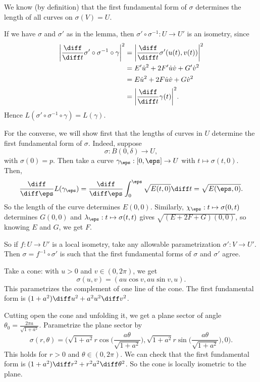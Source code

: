 \documentclass[12pt]{article}
\begin{document}
\begin{proofbox}
	We know (by definition) that the first fundamental form of $\sigma$ determines the length of all curves on $\sigma(V) = U$.

	If we have $\sigma$ and $\sigma'$ as in the lemma, then $\sigma' \circ \sigma^{-1} : U \to U'$ is an isometry, since
	\begin{align*}
		\biggl| \frac{\diff}{\diff t}\sigma' \circ \sigma^{-1} \circ \gamma \biggr|^2 &= \biggl|\frac{\diff}{\diff t} \sigma'(u(t), v(t)) \biggr|^2 \\
											      &= E' \dot u^2 + 2F' \dot u \dot v + G' \dot v^2 \\
											      &= E\dot u^2 + 2 F \dot u \dot v + G \dot v^2 \\
											      &= \biggl| \frac{\diff}{\diff t} \gamma(t)\biggr|^2.
	\end{align*}
	Hence $L(\sigma' \circ \sigma^{-1} \circ \gamma) = L(\gamma)$.

	For the converse, we will show first that the lengths of curves in $U$ determine the first fundamental form of $\sigma$. Indeed, suppose
	\[
	\sigma : B(0, \delta) \to U
	,\]
	with $\sigma(0) = p$. Then take a curve $\gamma_\eps : [0, \eps] \to U$ with $t \mapsto \sigma(t, 0)$. Then,
	\[
		\frac{\diff}{\diff \eps}L(\gamma_\eps) = \frac{\diff}{\diff \eps} \int_{0}^{\eps} \sqrt{E(t, 0)} \diff t = \sqrt{E(\eps, 0)}
	.\]
	So the length of the curve determines $E(0,0)$. Similarly, $\chi_\eps : t \mapsto \sigma(0, t)$ determines $G(0,0)$ and $\lambda_\eps : t \mapsto \sigma(t,t)$ gives $\sqrt{(E+2F+G)(0,0)}$, so knowing $E$ and $G$, we get $F$.

	So if $f : U \to U'$ is a local isometry, take any allowable parametrization $\sigma' : V \to U'$. Then $\sigma = f^{-1} \circ \sigma'$ is such that the first fundamental forms of $\sigma$ and $\sigma'$ agree.
\end{proofbox}

\begin{exbox}
	Take a cone: with $u > 0$ and $v \in (0, 2\pi)$, we get
	\[
	\sigma(u, v) = (au \cos v, a u \sin v, u)
	.\]
	This parametrizes the complement of one line of the cone. The first fundamental form is $(1+a^2)\diff u^2 + a^2 u^2 \diff v^2$.

	Cutting open the cone and unfolding it, we get a plane sector of angle $\theta_0 = \frac{2\pi a}{\sqrt{1 + a^2}}$. Parametrize the plane sector by
	\[
		\sigma(r, \theta) = \biggl(\sqrt{1+a^2} r \cos \biggl( \frac{a \theta}{\sqrt{1+a^2}}\biggr), \sqrt{1+a^2} r \sin \biggl(\frac{a \theta}{\sqrt{1+a^2}} \biggr), 0 \biggr)
	.\]
	This holds for $r > 0$ and $\theta \in (0, 2\pi)$. We can check that the first fundamental form is $(1+a^2)\diff r^2 + r^2 a^2 \diff \theta^2$. So the cone is locally isometric to the plane.
\end{exbox}
\end{document}
